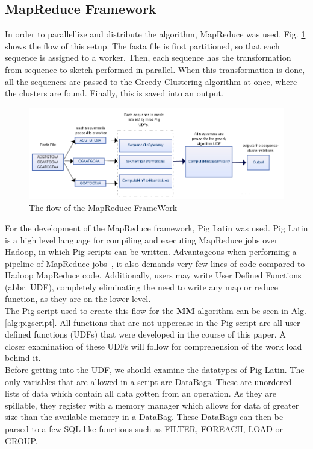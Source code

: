 \documentclass[../../main.tex]{subfiles}
\begin{document}
\subsection{MapReduce Framework}
In order to parallellize and distribute the algorithm, MapReduce was used. Fig. \ref{fig:mapredflow} shows the flow of this setup. The fasta file is first partitioned, so that each sequence is assigned to a worker. Then, each sequence has the transformation from sequence to sketch performed in parallel. When this transformation is done, all the sequences are passed to the Greedy Clustering algorithm at once, where the clusters are found. Finally, this is saved into an output.

\begin{figure}[h]
\centering
\includegraphics[scale=0.5]{data/MapReduce}
\caption{The flow of the MapReduce FrameWork}\label{fig:mapredflow}
\end{figure}

For the development of the MapReduce framework, Pig Latin was used. Pig Latin is a high level language for compiling and executing MapReduce jobs over Hadoop, in which Pig scripts can be written. Advantageous when performing a pipeline of MapReduce jobs~\cite{pig}, it also demands very few lines of code compared to Hadoop MapReduce code. Additionally, users may write User Defined Functions (abbr. UDF), completely eliminating the need to write any map or reduce function, as they are on the lower level.\\

The Pig script used to create this flow for the {\bf MM} algorithm can be seen in Alg. \ref{alg:pigscript}. All functions that are not uppercase in the Pig script are all user defined functions (UDFs) that were developed in the course of this paper. A closer examination of these UDFs will follow for comprehension of the work load behind it.\\

Before getting into the UDF, we should examine the datatypes of Pig Latin. The only variables that are allowed in a script are DataBags. These are unordered lists of data which contain all data gotten from an operation. As they are spillable, they register with a memory manager which allows for data of greater size than the available memory in a DataBag. These DataBags can then be parsed to a few SQL-like functions such as FILTER, FOREACH, LOAD or GROUP.\\
\end{document}

